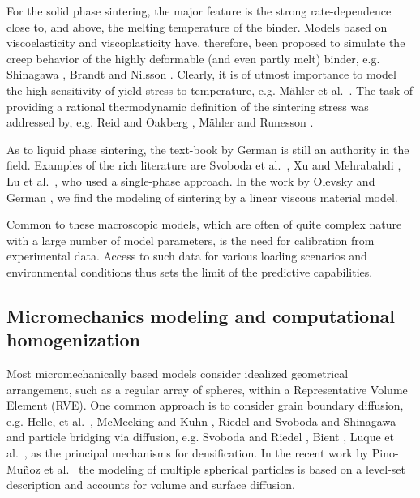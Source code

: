 \documentclass[MikaelDissertation.tex]{subfiles}
\begin{document}
For the solid phase sintering, the major feature is the strong rate-dependence close to, and above, the melting temperature of the binder.
Models based on viscoelasticity and viscoplasticity have, therefore, been proposed to simulate the creep behavior of the highly deformable (and even partly melt) binder, e.g. Shinagawa \cite{shinagawa_finite_1996}, Brandt and Nilsson \cite{brandt_fe-simulation_1998}.
Clearly, it is of utmost importance to model the high sensitivity of yield stress to temperature, e.g. Mähler et al.\ \cite{mahler_modelling_2000}.
The task of providing a rational thermodynamic definition of the sintering stress was addressed by, e.g. Reid and Oakberg \cite{reid_continuum_1990}, Mähler and Runesson \cite{mahler_constitutive_2003}.

As to liquid phase sintering, the text-book by German \cite{german_sintering_1996} is still an authority in the field.
Examples of the rich literature are Svoboda et al.\ \cite{svoboda_model_1996}, Xu and Mehrabahdi \cite{xu_micromechanical_1997}, Lu et al.\ \cite{lu_porosity_2001}, who used a single-phase approach.
In the work by Olevsky and German \cite{olevsky_theory_1998}, \cite{olevsky_effect_2000} we find the modeling of sintering by a linear viscous material model.

Common to these macroscopic models, which are often of quite complex nature with a large number of model parameters, is the need for calibration from experimental data.
Access to such data for various loading scenarios and environmental conditions thus sets the limit of the predictive capabilities.


\subsection{Micromechanics modeling and computational homogenization}

Most micromechanically based models consider idealized geometrical arrangement, such as a regular array of spheres, within a Representative Volume Element (RVE).
One common approach is to consider grain boundary diffusion, e.g. Helle, et al.\ \cite{helle_hot-isostatic_1985}, McMeeking and Kuhn \cite{mcmeeking_diffusional_1992}, Riedel and Svoboda \cite{riedel_theoretical_1993} and Shinagawa \cite{shinagawa_finite_1996} and particle bridging via diffusion, e.g. Svoboda and Riedel \cite{svoboda_new_1995}, Bient \cite{bient_modeling_2004}, Luque et al.\ \cite{luque_simulation_2005}, as the principal mechanisms for densification.
In the recent work by Pino-Muñoz et al.\ \cite{pino_munoz_direct_2013} the modeling of multiple spherical particles is based on a level-set description and accounts for volume and surface diffusion.
\end{document}
